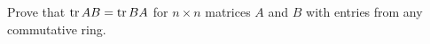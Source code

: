 \begin{prob}
    Prove that \( \operatorname{tr} AB = \operatorname{tr} BA \) for \( n \times n \) matrices \( A \) and \( B \) with entries 
    from any commutative ring.
\end{prob}
  